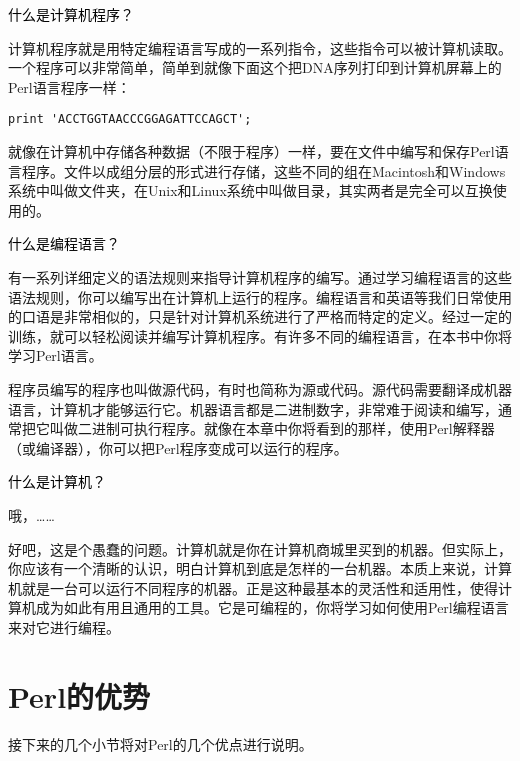 \textcolor{black}{什么是计算机程序？}

\begin{adjustwidth}{4em}{}
\hspace*{2em}计算机程序就是用特定编程语言写成的一系列指令，这些指令可以被计算机读取。一个程序可以非常简单，简单到就像下面这个把DNA序列打印到计算机屏幕上的Perl语言程序一样：

\begin{lstlisting}
print 'ACCTGGTAACCCGGAGATTCCAGCT';
\end{lstlisting}

就像在计算机中存储各种数据（不限于程序）一样，要在文件中编写和保存Perl语言程序。文件以成组分层的形式进行存储，这些不同的组在Macintosh和Windows系统中叫做文件夹，在Unix和Linux系统中叫做目录，其实两者是完全可以互换使用的。
\end{adjustwidth}

\textcolor{black}{什么是编程语言？}

\begin{adjustwidth}{4em}{}
\hspace*{2em}有一系列详细定义的语法规则来指导计算机程序的编写。通过学习编程语言的这些语法规则，你可以编写出在计算机上运行的程序。编程语言和英语等我们日常使用的口语是非常相似的，只是针对计算机系统进行了严格而特定的定义。经过一定的训练，就可以轻松阅读并编写计算机程序。有许多不同的编程语言，在本书中你将学习Perl语言。

程序员编写的程序也叫做源代码，有时也简称为源或代码。源代码需要翻译成机器语言，计算机才能够运行它。机器语言都是二进制数字，非常难于阅读和编写，通常把它叫做二进制可执行程序。就像在本章中你将看到的那样，使用Perl解释器（或编译器），你可以把Perl程序变成可以运行的程序。
\end{adjustwidth}

\textcolor{black}{什么是计算机？}

\begin{adjustwidth}{4em}{}
\hspace*{2em}哦，……

好吧，这是个愚蠢的问题。计算机就是你在计算机商城里买到的机器。但实际上，你应该有一个清晰的认识，明白计算机到底是怎样的一台机器。本质上来说，计算机就是一台可以运行不同程序的机器。正是这种最基本的灵活性和适用性，使得计算机成为如此有用且通用的工具。它是可编程的，你将学习如何使用Perl编程语言来对它进行编程。
\end{adjustwidth}

\section{Perl的优势}
接下来的几个小节将对Perl的几个优点进行说明。

